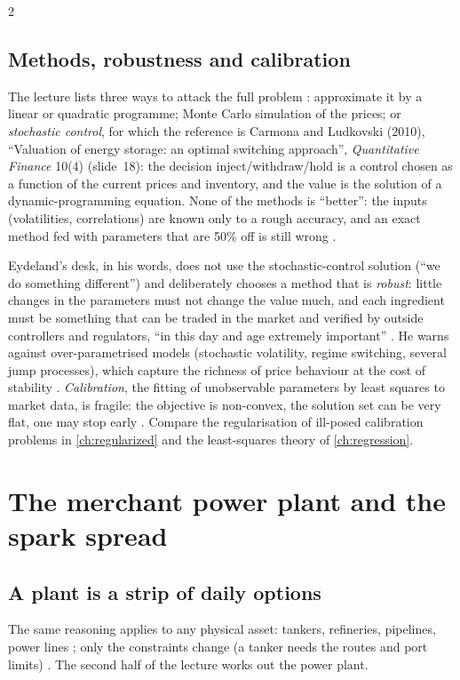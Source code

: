 \begin{paracol}{2}
\subsection{Methods, robustness and calibration}\label{ch21:sec-methods}
The lecture lists three ways to attack the full problem : approximate it by a linear or quadratic programme; Monte Carlo simulation of the prices; or \emph{stochastic control}, for which the reference is Carmona and Ludkovski (2010),
``Valuation of energy storage: an optimal switching approach'', \emph{Quantitative Finance} 10(4) (slide~18): the decision inject/withdraw/hold is a control chosen as a function of the current prices and inventory, and the value is the solution of a dynamic-programming equation. None of the methods is ``better'': the
inputs (volatilities, correlations) are known only to a rough accuracy, and an exact method fed with parameters that are 50\% off is still wrong .

\begin{finance}
Eydeland's desk, in his words, does not use the stochastic-control solution (``we do something different'') and deliberately chooses a method that is \emph{robust}: little changes in the parameters must not change the value much, and each ingredient must be
something that can be traded in the market and verified by outside controllers and regulators, ``in this day and age extremely important'' . He warns against over-parametrised models (stochastic volatility, regime switching, several jump processes),
which capture the richness of price behaviour at the cost of stability . \emph{Calibration}, the fitting of unobservable parameters by least squares to market data, is fragile: the objective is non-convex, the solution set can be very flat, one may stop early
. Compare the regularisation of ill-posed calibration problems in \cref{ch:regularized} and the least-squares theory of \cref{ch:regression}.
\end{finance}

\section{The merchant power plant and the spark spread}\label{ch21:sec-plant}

\subsection{A plant is a strip of daily options}
The same reasoning applies to any physical asset: tankers, refineries, pipelines, power lines ; only the constraints change (a tanker needs the routes and port limits) . The second half of the lecture works out the power plant.


\end{paracol}
